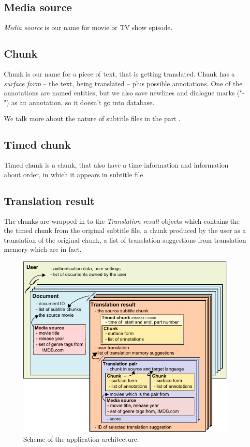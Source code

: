 \subsection*{Media source}
\emph{Media source} is our name for movie or TV show episode.

\subsection*{Chunk}
Chunk is our name for a piece of text, that is getting translated. Chunk has a \emph{surface form} -- the text, being translated -- plus possible annotations. One of the annotations are named entities, but we also save newlines and dialogue marks ("-") as an annotation, so it doesn't go into database.

We talk more about the nature of subtitle files in the part \label{subtitle_formats}.

\subsection*{Timed chunk}
Timed chunk is a chunk, that also have a time information and information about order, in which it appears in subtitle file.

\subsection*{Translation result}
The chunks are wrapped in to the \emph{Translation result} objects which contains the the timed chunk from the original subtitle file, a chunk produced by the user as a translation of the original chunk, a list of translation suggestions from translation memory which are in fact.


\begin{figure}[h]
\begin{center}
\includegraphics{figures/shared_classes.pdf}
\end{center}
\caption{Scheme of the application architecture.}\label{projectStructure:logical}
\end{figure}

